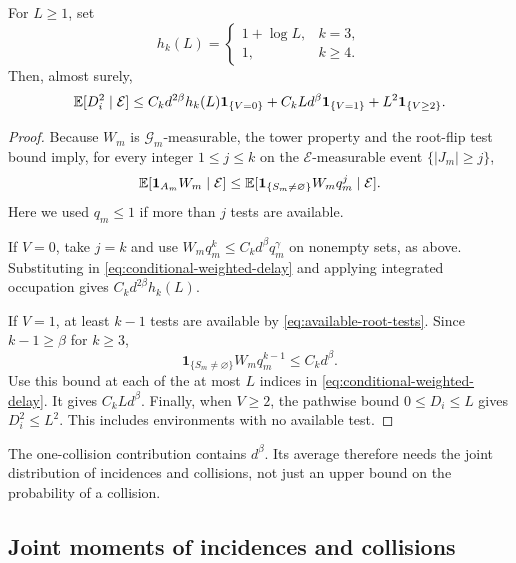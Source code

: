 \begin{proposition}
\label{prop:conditional-squared-delay}
For \(L\ge1\), set
\[
 h_k(L)=
 \begin{cases}
 1+\log L,&k=3,\\
 1,&k\ge4.
 \end{cases}
\]
Then, almost surely,
\begin{equation}\label{eq:conditional-squared-delay}
 \mathbb E[D_i^2\mid\mathcal E]
 \le C_kd^{2\beta}h_k(L)\mathbf1_{\{V=0\}}
      +C_kLd^\beta\mathbf1_{\{V=1\}}
      +L^2\mathbf1_{\{V\ge2\}}.
\end{equation}
\end{proposition}

\begin{proof}
Because \(W_m\) is \(\mathcal G_m\)-measurable, the tower property
and the root-flip test bound imply, for every integer \(1\le j\le k\)
on the \(\mathcal E\)-measurable event \(\{|J_m|\ge j\}\),
\[
 \mathbb E[\mathbf1_{A_m}W_m\mid\mathcal E]
 \le\mathbb E[\mathbf1_{\{S_m\ne\varnothing\}}W_mq_m^j
         \mid\mathcal E].
\]
Here we used \(q_m\le1\) if more than \(j\) tests are available.

If \(V=0\), take \(j=k\) and use
\(W_mq_m^k\le C_kd^\beta q_m^\gamma\) on nonempty sets, as above.
Substituting in
\eqref{eq:conditional-weighted-delay} and applying integrated
occupation gives \(C_kd^{2\beta}h_k(L)\).

If \(V=1\), at least \(k-1\) tests are available by
\eqref{eq:available-root-tests}.  Since \(k-1\ge\beta\) for \(k\ge3\),
\[
 \mathbf1_{\{S_m\ne\varnothing\}}W_mq_m^{k-1}
 \le C_kd^\beta.
\]
Use this bound at each of the at most \(L\) indices in
\eqref{eq:conditional-weighted-delay}.  It gives \(C_kLd^\beta\).
Finally, when \(V\ge2\), the pathwise bound \(0\le D_i\le L\)
gives \(D_i^2\le L^2\).  This includes environments with no
available test.
\end{proof}

The one-collision contribution contains \(d^\beta\).  Its average
therefore needs the joint distribution of incidences and collisions,
not just an upper bound on the probability of a collision.

\subsection{Joint moments of incidences and collisions}

